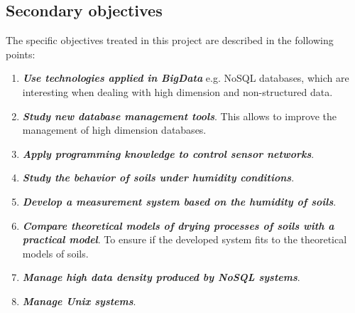 \subsection{Secondary objectives}

The specific objectives treated in this project are described in the following points:

\begin{enumerate}

\item \textbf{\textit{Use technologies applied in BigData}} \cite{que_es_big_data, importancia_big_data, big_data_applications} e.g. NoSQL \cite{que_es_no_sql, sql_vs_nosql, nosql_databases} databases, which are interesting when dealing with high dimension and non-structured data.

\item \textbf{\textit{Study new database management tools}}. This allows to improve the management of high dimension databases.

\item \textbf{\textit{Apply programming knowledge to control sensor networks}}.

\item \textbf{\textit{Study the behavior of soils under humidity conditions}}.

\item \textbf{\textit{Develop a measurement system based on the humidity of soils}}.

\item \textbf{\textit{Compare theoretical models of drying processes of soils with a practical model}}. To ensure if the developed system fits to the theoretical models of soils.

\item \textbf{\textit{Manage high data density produced by NoSQL systems}}.

\item \textbf{\textit{Manage Unix systems}}.

\end{enumerate}




